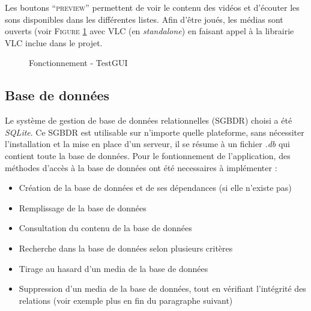 Les boutons ``\textsc{preview}'' permettent de voir le contenu des vidéos et d'écouter les sons disponibles dans les différentes listes. Afin d'être joués, les médias sont ouverts (voir \textsc{Figure} \ref{VLC} avec VLC (en \textit{standalone}) en faisant appel à la librairie VLC inclue dans le projet.

\begin{figure}[!ht]
\begin{center}
  \caption{Fonctionnement - TestGUI}
  \label{VLC} 
\end{center}
\end{figure}

\subsection{Base de données}\label{BDD}

Le système de gestion de base de données relationnelles (SGBDR) choisi a été \textit{SQLite}. Ce SGBDR est utilisable sur n'importe quelle plateforme, sans nécessiter l'installation et la mise en place d'un serveur, il se résume à un fichier \textit{.db} qui contient toute la base de données.
Pour le fontionnement de l'application, des méthodes d'accès à la base de données ont été necessaires à implémenter :


\begin{itemize}
 \item Création de la base de données et de ses dépendances (si elle n'existe pas)
 \item Remplissage de la base de données
 \item Consultation du contenu de la base de données
 \item Recherche dans la base de données selon plusieurs critères
 \item Tirage au hasard d'un media de la base de données
 \item Suppression d'un media de la base de données, tout en vérifiant l'intégrité des relations (voir exemple plus en fin du paragraphe suivant)
\end{itemize}


